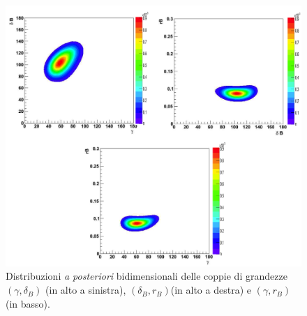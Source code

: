 \begin{figure}[htbp] 
\begin{center}
\includegraphics[width=1\textwidth]{Immagini/correlazione}
\caption{Distribuzioni \emph{a posteriori} bidimensionali delle coppie di grandezze $(\gamma, \delta_B)$ (in alto a sinistra), $(\delta_B, r_B)$(in alto a destra) e $(\gamma, r_B)$ (in basso).}
\label{correlazione}
\end{center}
\end{figure}



